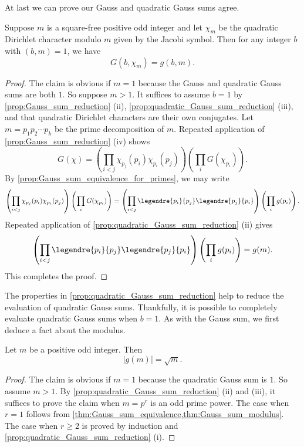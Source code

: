 \documentclass[12pt]{article}
\begin{document}
      At last we can prove our Gauss and quadratic Gauss sums agree.

      \begin{theorem}\label{thm:Gauss_sum_equivalence}
        Suppose \(m\) is a square-free positive odd integer and let \(\chi_{m}\) be the quadratic Dirichlet character modulo \(m\) given by the Jacobi symbol. Then for any integer \(b\) with \((b,m) = 1\), we have
        \[
          G(b,\chi_{m}) = g(b,m).
        \]
      \end{theorem}
      \begin{proof}
        The claim is obvious if \(m = 1\) because the Gauss and quadratic Gauss sums are both \(1\). So suppose \(m > 1\). It suffices to assume \(b = 1\) by \cref{prop:Gauss_sum_reduction} (ii), \cref{prop:quadratic_Gauss_sum_reduction} (iii), and that quadratic Dirichlet characters are their own conjugates. Let \(m = p_{1}p_{2} \cdots p_{k}\) be the prime decomposition of \(m\). Repeated application of \cref{prop:Gauss_sum_reduction} (iv) shows
        \[
          G(\chi) = \left(\prod_{i < j}\chi_{p_{j}}(p_{i})\chi_{p_{i}}(p_{j})\right)\left(\prod_{i}G(\chi_{p_{i}})\right).
        \]
        By \cref{prop:Gauss_sum_equivalence_for_primes}, we may write
        \[
          \left(\prod_{i < j}\chi_{p_{j}}(p_{i})\chi_{p_{i}}(p_{j})\right)\left(\prod_{i}G(\chi_{p_{i}})\right) = \left(\prod_{i < j}\legendre{p_{i}}{p_{j}}\legendre{p_{j}}{p_{i}}\right)\left(\prod_{i}g(p_{i})\right).
        \]
        Repeated application of \cref{prop:quadratic_Gauss_sum_reduction} (ii) gives
        \[
          \left(\prod_{i < j}\legendre{p_{i}}{p_{j}}\legendre{p_{j}}{p_{i}}\right)\left(\prod_{i}g(p_{i})\right) = g(m).
        \]
        This completes the proof.
      \end{proof}

      The properties in \cref{prop:quadratic_Gauss_sum_reduction} help to reduce the evaluation of quadratic Gauss sums. Thankfully, it is possible to completely evaluate quadratic Gauss sums when \(b = 1\). As with the Gauss sum, we first deduce a fact about the modulus.

      \begin{theorem}\label{thm:quadratic_Gauss_sum_modulus}
        Let \(m\) be a positive odd integer. Then
        \[
          |g(m)| = \sqrt{m}.
        \]
      \end{theorem}
      \begin{proof}
        The claim is obvious if \(m = 1\) because the quadratic Gauss sum is \(1\). So assume \(m > 1\). By \cref{prop:quadratic_Gauss_sum_reduction} (ii) and (iii), it suffices to prove the claim when \(m = p^{r}\) is an odd prime power. The case when \(r = 1\) follows from \cref{thm:Gauss_sum_equivalence,thm:Gauss_sum_modulus}. The case when \(r \ge 2\) is proved by induction and \cref{prop:quadratic_Gauss_sum_reduction} (i).
      \end{proof}
\end{document}
